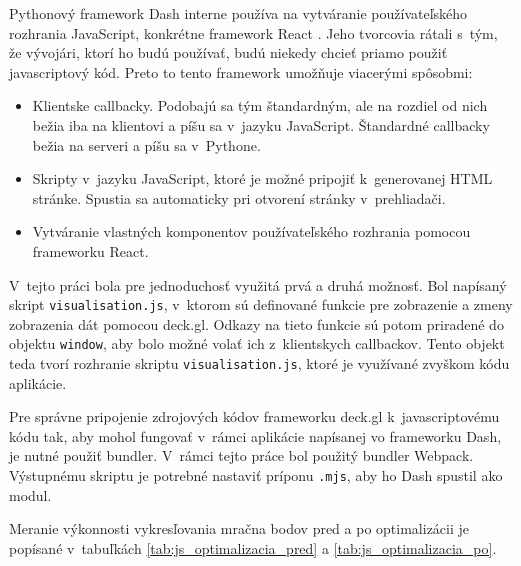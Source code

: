 Pythonový framework Dash interne používa na vytváranie používateľského rozhrania JavaScript, konkrétne framework React \cite{dash_documentation}. Jeho tvorcovia rátali s~tým, že vývojári, ktorí ho budú používať, budú niekedy chcieť priamo použiť javascriptový kód. Preto to tento framework umožňuje viacerými spôsobmi:

\begin{itemize}
    \item Klientske callbacky. Podobajú sa tým štandardným, ale na rozdiel od nich bežia iba na klientovi a píšu sa v~jazyku JavaScript. Štandardné callbacky bežia na serveri a píšu sa v~Pythone.
    \item Skripty v~jazyku JavaScript, ktoré je možné pripojiť k~generovanej HTML stránke. Spustia sa automaticky pri otvorení stránky v~prehliadači.
    \item Vytváranie vlastných komponentov používateľského rozhrania pomocou frameworku React.
\end{itemize}

V~tejto práci bola pre jednoduchosť využitá prvá a druhá možnosť. Bol napísaný skript \texttt{visualisation.js}, v~ktorom sú definované funkcie pre zobrazenie a zmeny zobrazenia dát pomocou deck.gl. Odkazy na tieto funkcie sú potom priradené do objektu \texttt{window}, aby bolo možné volať ich z~klientskych callbackov. Tento objekt teda tvorí rozhranie skriptu \texttt{visualisation.js}, ktoré je využívané zvyškom kódu aplikácie.

Pre správne pripojenie zdrojových kódov frameworku deck.gl k~javascriptovému kódu tak, aby mohol fungovať v~rámci aplikácie napísanej vo frameworku Dash, je nutné použiť bundler. V~rámci tejto práce bol použitý bundler Webpack. Výstupnému skriptu je potrebné nastaviť príponu \texttt{.mjs}, aby ho Dash spustil ako modul.

Meranie výkonnosti vykresľovania mračna bodov pred a po optimalizácii je popísané v~tabuľkách \ref{tab:js_optimalizacia_pred} a \ref{tab:js_optimalizacia_po}.

